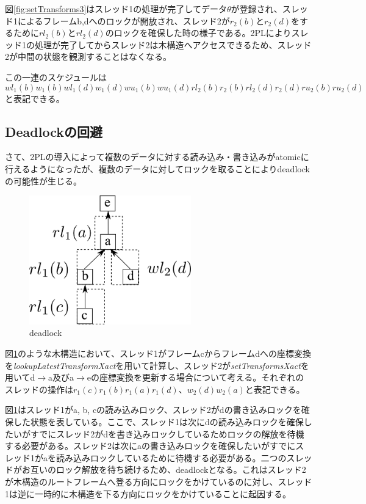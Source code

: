 \documentclass[a4paper]{jreport}	%
\begin{document}
図\ref{fig:setTransforms3}はスレッド1の処理が完了してデータ$\theta$が登録され、スレッド1によるフレームb,dへのロックが開放され、スレッド2が$r_2(b)$と$r_2(d)$をするために$rl_2(b)$と$rl_2(d)$のロックを確保した時の様子である。2PLによりスレッド1の処理が完了してからスレッド2は木構造へアクセスできるため、スレッド2が中間の状態を観測することはなくなる。

この一連のスケジュールは
\begin{equation}
	wl_1(b)w_1(b)wl_1(d)w_1(d)wu_1(b)wu_1(d)rl_2(b)r_2(b)rl_2(d)r_2(d)ru_2(b)ru_2(d)
\end{equation}
と表記できる。

\subsection{Deadlockの回避}
さて、2PLの導入によって複数のデータに対する読み込み・書き込みがatomicに行えるようになったが、複数のデータに対してロックを取ることによりdeadlockの可能性が生じる。


\begin{figure}[h] 
\centering
\includegraphics[width=7cm]{deadlock}
\caption{deadlock}
\label{fig:deadlock}
\end{figure}

図\ref{fig:deadlock}のような木構造において、スレッド1がフレームcからフレームdへの座標変換を\textit{lookupLatestTransformXact}を用いて計算し、スレッド2が\textit{setTransformsXact}を用いてd$\rightarrow$a及びa$\rightarrow$eの座標変換を更新する場合について考える。それぞれのスレッドの操作は$r_1(c)r_1(b)r_1(a)r_1(d)$、$w_2(d)w_2(a)$と表記できる。

図\ref{fig:deadlock}はスレッド1がa, b, cの読み込みロック、スレッド2がdの書き込みロックを確保した状態を表している。ここで、スレッド1は次にdの読み込みロックを確保したいがすでにスレッド2がdを書き込みロックしているためロックの解放を待機する必要がある。スレッド2は次にaの書き込みロックを確保したいがすでにスレッド1がaを読み込みロックしているために待機する必要がある。二つのスレッドがお互いのロック解放を待ち続けるため、deadlockとなる。これはスレッド2が木構造のルートフレームへ登る方向にロックをかけているのに対し、スレッド1は逆に一時的に木構造を下る方向にロックをかけていることに起因する。
\end{document}
